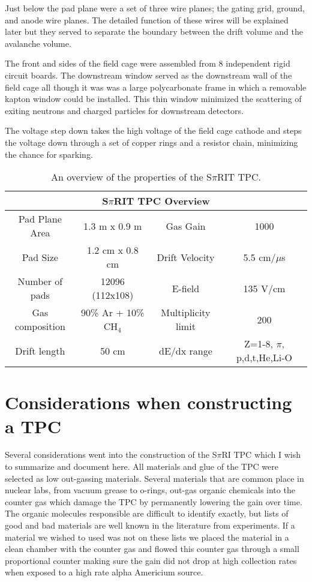 Just below the pad plane were a set of three wire planes; the gating grid, ground, and anode wire planes. The detailed function of these wires will be explained later but they served to separate the boundary between the drift volume and the avalanche volume. 

The front and sides of the field cage were assembled from 8 independent rigid circuit boards. The downstream window served as the downstream wall of the field cage all though it was was a large polycarbonate frame in which a removable kapton window could be installed. This thin window minimized the scattering of exiting neutrons and charged particles for downstream detectors. 

The voltage step down takes the high voltage of the field cage cathode and steps the voltage down through a set of copper rings and a resistor chain, minimizing the chance for sparking. 

\begin{table}
 \begin{tabular}{||c c c c||} 
 \hline
 \multicolumn{4}{|c|}{S$\pi$RIT TPC Overview} \\
 \hline
 Pad Plane Area & 1.3 m x 0.9 m & Gas Gain & 1000\\
 \hline
 Pad Size & 1.2 cm x 0.8 cm & Drift Velocity & 5.5 cm/$\mu$s \\
 \hline
 Number of pads & 12096 (112x108) & E-field & 135 V/cm  \\
 \hline
  Gas composition & 90\% Ar + 10\% CH${}_4$ & Multiplicity limit & 200  \\
 \hline
 Drift length & 50 cm & dE/dx range & Z=1-8, $\pi$, p,d,t,He,Li-O \\ [1ex] 
 \hline
\end{tabular}
\caption{An overview of the properties of the S$\pi$RIT TPC.}
\label{tb:spiritoverview}
\end{table}

\section{Considerations when constructing a TPC}
Several considerations went into the construction of the S$\pi$RI TPC which I wish to summarize and document here. All materials and glue of the TPC were selected as low out-gassing materials. Several materials that are common place in nuclear labs, from vacuum grease to o-rings, out-gas organic chemicals into the counter gas which damage the TPC by permanently lowering the gain over time. The organic molecules responsible are difficult to identify exactly, but lists of good and bad materials are well known in the literature from experiments. If a material we wished to used was not on these lists we placed the material in a clean chamber with the counter gas and flowed this counter gas through a small proportional counter making sure the gain did not drop at high collection rates when exposed to a high rate alpha Americium source. 

